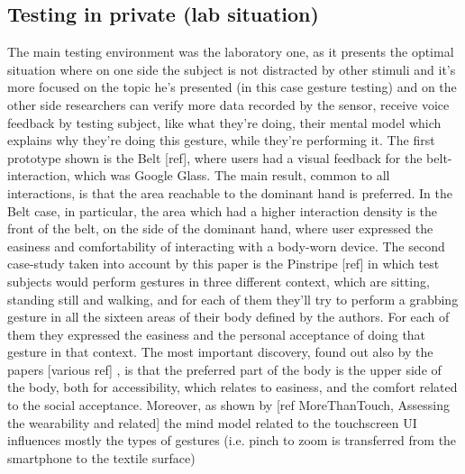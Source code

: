 \documentclass{sigchi}
\begin{document}
\subsection{Testing in private (lab situation)}
The main testing environment was the laboratory one, as it presents the optimal situation where on one side the subject is not distracted by other stimuli and it’s more focused on the topic he’s presented (in this case  gesture testing) and on the other side researchers can verify more data recorded by the sensor, receive voice feedback by testing subject, like what they’re doing, their mental model which explains why they’re doing this gesture, while they’re performing it. The first prototype shown is the Belt [ref], where users had a visual feedback for the belt-interaction, which was Google Glass. The main result, common to all interactions, is that the area reachable to the dominant hand is preferred. In the Belt case, in particular, the area which had a higher interaction density is the front of the belt, on the side of the dominant hand, where user expressed the easiness and comfortability of interacting with a body-worn device. The second case-study taken into account by this paper is the Pinstripe [ref] in which test subjects would perform gestures in three different context, which are sitting, standing still and walking, and  for each of them they’ll try to perform a grabbing gesture in all the sixteen areas of their body defined by the authors. For each of them they expressed the easiness and the personal acceptance of doing that gesture in that context. The most important discovery, found out also by the  papers [various ref] , is that the preferred part of the body is the upper side of the body, both for accessibility, which relates to easiness, and the comfort related to the social acceptance.
Moreover, as shown by [ref MoreThanTouch, Assessing the wearability and related] the mind model related to the touchscreen UI influences mostly the types of gestures (i.e. pinch to zoom is transferred from the smartphone to the textile surface)
\end{document}
